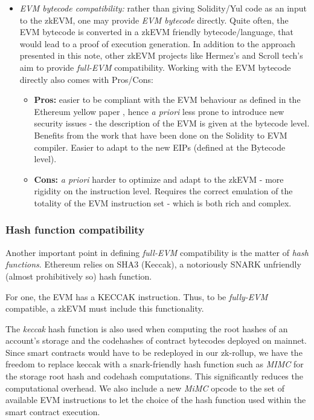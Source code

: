 \begin{itemize}
    \item \textit{EVM bytecode compatibility:} rather than giving Solidity/Yul code as an input to the zkEVM, one may provide \textit{EVM bytecode} directly. Quite often, the EVM bytecode is converted in a zkEVM friendly bytecode/language, that would lead to a proof of execution generation. In addition to the approach presented in this note, other zkEVM projects like Hermez's \cite{hermez} and Scroll tech's \cite{scroll} aim to provide \textit{full-EVM} compatibility. Working with the EVM bytecode directly also comes with Pros/Cons:
    \begin{itemize}
        \item \textbf{Pros:} easier to be compliant with the EVM behaviour as defined in the Ethereum yellow paper \cite{EthYellowpaperBerlin}, hence \textit{a priori} less prone to introduce new security issues - the description of the EVM is given at the bytecode level. Benefits from the work that have been done on the Solidity to EVM compiler. Easier to adapt to the new EIPs (defined at the Bytecode level). 
        \item \textbf{Cons:} \textit{a priori} harder to optimize and adapt to the zkEVM - more rigidity on the instruction level. Requires the correct emulation of the totality of the EVM instruction set - which is both rich and complex.
    \end{itemize}
\end{itemize}


\subsubsection{Hash function compatibility}
Another important point in defining \textit{full-EVM} compatibility is the matter of \textit{hash functions}. Ethereum relies on SHA3 (Keccak), a notoriously SNARK unfriendly (almost prohibitively so) hash function.

For one, the EVM has a KECCAK instruction. Thus, to be \textit{fully-EVM} compatible, a zkEVM must include this functionality.

The \textit{keccak} hash function is also used when computing the root hashes of an account's storage and the codehashes of contract bytecodes deployed on mainnet. Since smart contracts would have to be redeployed in our zk-rollup, we have the freedom to replace keccak with a snark-friendly hash function such as \textit{MIMC} for the storage root hash and codehash computations. This significantly reduces the computational overhead. We also include a new \textit{MiMC} opcode to the set of available EVM instructions to let the choice of the hash function used within the smart contract execution.
